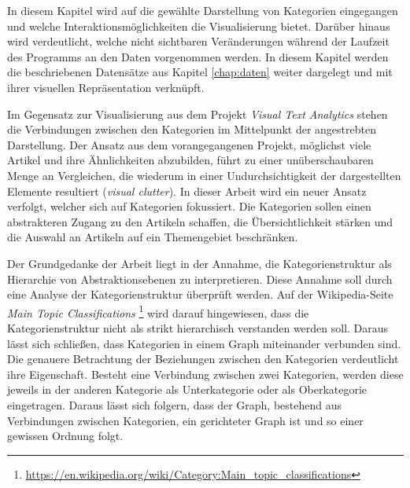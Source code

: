 
In diesem Kapitel wird auf die gewählte Darstellung von Kategorien eingegangen und welche Interaktionsmöglichkeiten die Visualisierung bietet.
Darüber hinaus wird verdeutlicht, welche nicht sichtbaren Veränderungen während der Laufzeit des Programms an den Daten vorgenommen werden.
In diesem Kapitel werden die beschriebenen Datensätze aus Kapitel \ref{chap:daten} weiter dargelegt und mit ihrer visuellen Repräsentation verknüpft.

Im Gegensatz zur Visualisierung aus dem Projekt \emph{Visual Text Analytics} stehen die Verbindungen zwischen den Kategorien im Mittelpunkt der angestrebten Darstellung.
Der Ansatz aus dem vorangegangenen Projekt, möglichst viele Artikel und ihre Ähnlichkeiten abzubilden, führt zu einer unüberschaubaren Menge an Vergleichen, die wiederum in einer Undurchsichtigkeit der dargestellten Elemente resultiert (\emph{visual clutter}).
In dieser Arbeit wird ein neuer Ansatz verfolgt, welcher sich auf Kategorien fokussiert.
Die Kategorien sollen einen abstrakteren Zugang zu den Artikeln schaffen, die Übersichtlichkeit stärken und die Auswahl an Artikeln auf ein Themengebiet beschränken.

Der Grundgedanke der Arbeit liegt in der Annahme, die Kategorienstruktur als Hierarchie von Abstraktionsebenen zu interpretieren.
Diese Annahme soll durch eine Analyse der Kategorienstruktur überprüft werden.
Auf der Wikipedia-Seite \emph{Main Topic Classifications} \footnote{\url{https://en.wikipedia.org/wiki/Category:Main_topic_classifications}} wird darauf hingewiesen, dass die Kategorienstruktur nicht als strikt hierarchisch verstanden werden soll.
Daraus lässt sich schließen, dass Kategorien in einem Graph miteinander verbunden sind.
Die genauere Betrachtung der Beziehungen zwischen den Kategorien verdeutlicht ihre Eigenschaft.
Besteht eine Verbindung zwischen zwei Kategorien, werden diese jeweils in der anderen Kategorie als Unterkategorie oder als Oberkategorie eingetragen. 
Daraus lässt sich folgern, dass der Graph, bestehend aus Verbindungen zwischen Kategorien, ein gerichteter Graph ist und so einer gewissen Ordnung folgt.

